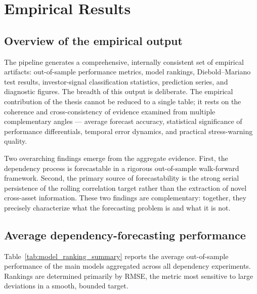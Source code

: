 \section{Empirical Results}

\subsection{Overview of the empirical output}

The pipeline generates a comprehensive, internally consistent set of empirical artifacts: out-of-sample performance metrics, model rankings, Diebold--Mariano test results, investor-signal classification statistics, prediction series, and diagnostic figures. The breadth of this output is deliberate. The empirical contribution of the thesis cannot be reduced to a single table; it rests on the coherence and cross-consistency of evidence examined from multiple complementary angles --- average forecast accuracy, statistical significance of performance differentials, temporal error dynamics, and practical stress-warning quality.

Two overarching findings emerge from the aggregate evidence. First, the dependency process is forecastable in a rigorous out-of-sample walk-forward framework. Second, the primary source of forecastability is the strong serial persistence of the rolling correlation target rather than the extraction of novel cross-asset information. These two findings are complementary: together, they precisely characterize what the forecasting problem is and what it is not.

\subsection{Average dependency-forecasting performance}

Table~\ref{tab:model_ranking_summary} reports the average out-of-sample performance of the main models aggregated across all dependency experiments. Rankings are determined primarily by RMSE, the metric most sensitive to large deviations in a smooth, bounded target.

